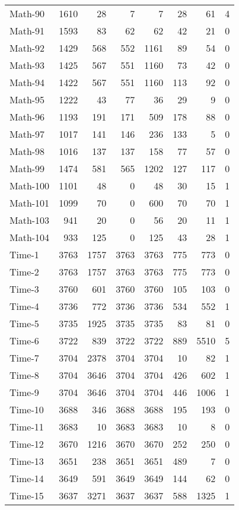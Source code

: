 \begin{footnotesize}
\begin{longtable}{lrrrrrrc}
Math-90 &  1610 & 28 & 7 & 7 & 28  & 61 & 4\\
Math-91 &  1593 & 83 & 62 & 62 & 42  & 21 & 0\\
Math-92 &  1429 & 568 & 552 & 1161 & 89  & 54 & 0\\
Math-93 &  1425 & 567 & 551 & 1160 & 73  & 42 & 0\\
Math-94 &  1422 & 567 & 551 & 1160 & 113  & 92 & 0\\
Math-95 &  1222 & 43 & 77 & 36 & 29  & 9 & 0\\
Math-96 &  1193 & 191 & 171 & 509 & 178  & 88 & 0\\
Math-97 &  1017 & 141 & 146 & 236 & 133  & 5 & 0\\
Math-98 &  1016 & 137 & 137 & 158 & 77  & 57 & 0\\
Math-99 &  1474 & 581 & 565 & 1202 & 127  & 117 & 0\\
Math-100 &  1101 & 48 & 0 & 48 & 30  & 15 & 1\\
Math-101 &  1099 & 70 & 0 & 600 & 70  & 70 & 1\\
Math-103 &  941 & 20 & 0 & 56 & 20  & 11 & 1\\
Math-104 &  933 & 125 & 0 & 125 & 43  & 28 & 1\\
Time-1 &  3763 & 1757 & 3763 & 3763 & 775  & 773 & 0\\
Time-2 &  3763 & 1757 & 3763 & 3763 & 775  & 773 & 0\\
Time-3 &  3760 & 601 & 3760 & 3760 & 105  & 103 & 0\\
Time-4 &  3736 & 772 & 3736 & 3736 & 534  & 552 & 1\\
Time-5 &  3735 & 1925 & 3735 & 3735 & 83  & 81 & 0\\
Time-6 &  3722 & 839 & 3722 & 3722 & 889  & 5510 & 5\\
Time-7 &  3704 & 2378 & 3704 & 3704 & 10  & 82 & 1\\
Time-8 &  3704 & 3646 & 3704 & 3704 & 426  & 602 & 1\\
Time-9 &  3704 & 3646 & 3704 & 3704 & 446  & 1006 & 1\\
Time-10 &  3688 & 346 & 3688 & 3688 & 195  & 193 & 0\\
Time-11 &  3683 & 10 & 3683 & 3683 & 10  & 8 & 0\\
Time-12 &  3670 & 1216 & 3670 & 3670 & 252  & 250 & 0\\
Time-13 &  3651 & 238 & 3651 & 3651 & 489  & 7 & 0\\
Time-14 &  3649 & 591 & 3649 & 3649 & 144  & 62 & 0\\
Time-15 &  3637 & 3271 & 3637 & 3637 & 588  & 1325 & 1\\

\end{longtable}
\end{footnotesize}
